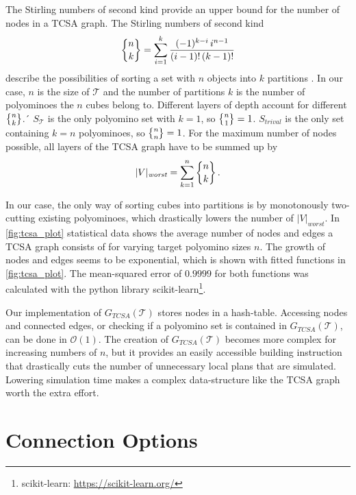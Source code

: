 The Stirling numbers of second kind provide an upper bound for the number of nodes in a TCSA graph.
The Stirling numbers of second kind
\begin{equation}
\bracenom{n}{k} = \sum_{i=1}^{k} \frac{(-1)^{k-i} \, i^{n-1}}{(i-1)! \, (k-1)!}
\end{equation}
describe the possibilities of sorting a set with $n$ objects into $k$ partitions \cite{jelliss1991}.
In our case, $n$ is the size of $\mathcal{T}$ and the number of partitions $k$ is the number of polyominoes the $n$ cubes belong to.
Different layers of depth account for different $\bracenom{n}{k}$.´
$S_\mathcal{T}$ is the only polyomino set with $k=1$, so $\bracenom{n}{1} = 1$.
$S_\textit{trival}$ is the only set containing $k=n$ polyominoes, so $\bracenom{n}{n} = 1$.
For the maximum number of nodes possible, all layers of the TCSA graph have to be summed up by
\begin{equation}
|V|_\textit{worst} = \sum_{k=1}^{n} \bracenom{n}{k} \, .
\end{equation}

In our case, the only way of sorting cubes into partitions is by monotonously two-cutting existing polyominoes, which drastically lowers the number of $|V|_\textit{worst}$.
In \autoref{fig:tcsa_plot} statistical data shows the average number of nodes and edges a TCSA graph consists of for varying target polyomino sizes $n$.
The growth of nodes and edges seems to be exponential, which is shown with fitted functions in \autoref{fig:tcsa_plot}.
The mean-squared error of $0.9999$ for both functions was calculated with the python library scikit-learn\footnote{scikit-learn: \url{https://scikit-learn.org/}}.

Our implementation of $G_{\textit{TCSA}}(\mathcal{T})$ stores nodes in a hash-table.
Accessing nodes and connected edges, or checking if a polyomino set is contained in $G_{\textit{TCSA}}(\mathcal{T})$, can be done in  $\mathcal{O}(1)$.
The creation of $G_{\textit{TCSA}}(\mathcal{T})$ becomes more complex for increasing numbers of $n$, but it provides an easily accessible building instruction that drastically cuts the number of unnecessary local plans that are simulated.
Lowering simulation time makes a complex data-structure like the TCSA graph worth the extra effort.

\newpage

\section{Connection Options}
\label{sec:connect_options}


